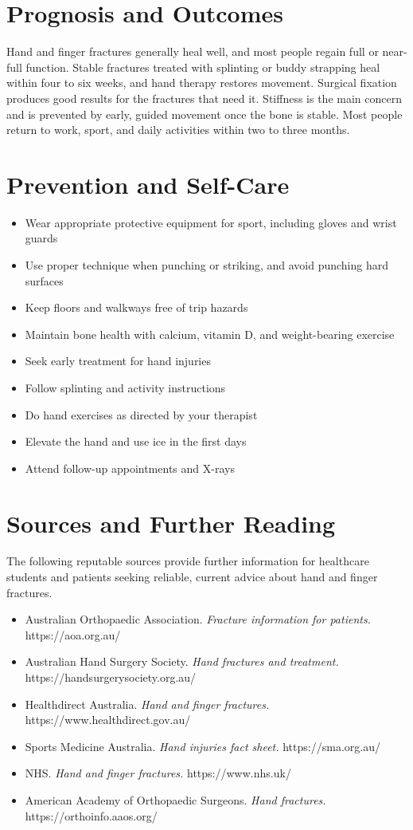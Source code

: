 \section*{Prognosis and Outcomes}
Hand and finger fractures generally heal well, and most people regain full or near-full function. Stable fractures treated with splinting or buddy strapping heal within four to six weeks, and hand therapy restores movement. Surgical fixation produces good results for the fractures that need it. Stiffness is the main concern and is prevented by early, guided movement once the bone is stable. Most people return to work, sport, and daily activities within two to three months.

\section*{Prevention and Self-Care}
\begin{itemize}
    \item Wear appropriate protective equipment for sport, including gloves and wrist guards
    \item Use proper technique when punching or striking, and avoid punching hard surfaces
    \item Keep floors and walkways free of trip hazards
    \item Maintain bone health with calcium, vitamin D, and weight-bearing exercise
    \item Seek early treatment for hand injuries
    \item Follow splinting and activity instructions
    \item Do hand exercises as directed by your therapist
    \item Elevate the hand and use ice in the first days
    \item Attend follow-up appointments and X-rays
\end{itemize}

\section*{Sources and Further Reading}
The following reputable sources provide further information for healthcare students and patients seeking reliable, current advice about hand and finger fractures.

\begin{itemize}
    \item Australian Orthopaedic Association. \textit{Fracture information for patients.} https://aoa.org.au/
    \item Australian Hand Surgery Society. \textit{Hand fractures and treatment.} https://handsurgerysociety.org.au/
    \item Healthdirect Australia. \textit{Hand and finger fractures.} https://www.healthdirect.gov.au/
    \item Sports Medicine Australia. \textit{Hand injuries fact sheet.} https://sma.org.au/
    \item NHS. \textit{Hand and finger fractures.} https://www.nhs.uk/
    \item American Academy of Orthopaedic Surgeons. \textit{Hand fractures.} https://orthoinfo.aaos.org/
\end{itemize}
